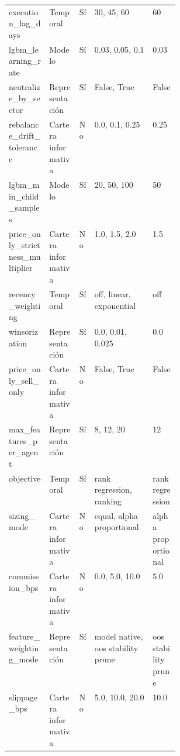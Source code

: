 \begin{longtable}{lllp{0.34\linewidth}l}
execution\_lag\_days & Temporal & Sí & 30, 45, 60 & 60 \\
lgbm\_learning\_rate & Modelo & Sí & 0.03, 0.05, 0.1 & 0.03 \\
neutralize\_by\_sector & Representación & Sí & False, True & False \\
rebalance\_drift\_tolerance & Cartera informativa & No & 0.0, 0.1, 0.25 & 0.25 \\
lgbm\_min\_child\_samples & Modelo & Sí & 20, 50, 100 & 50 \\
price\_only\_strictness\_multiplier & Cartera informativa & No & 1.0, 1.5, 2.0 & 1.5 \\
recency\_weighting & Temporal & Sí & off, linear, exponential & off \\
winsorization & Representación & Sí & 0.0, 0.01, 0.025 & 0.0 \\
price\_only\_sell\_only & Cartera informativa & No & False, True & False \\
max\_features\_per\_agent & Representación & Sí & 8, 12, 20 & 12 \\
objective & Temporal & Sí & rank regression, ranking & rank regression \\
sizing\_mode & Cartera informativa & No & equal, alpha proportional & alpha proportional \\
commission\_bps & Cartera informativa & No & 0.0, 5.0, 10.0 & 5.0 \\
feature\_weighting\_mode & Representación & Sí & model native, oos stability prune & oos stability prune \\
slippage\_bps & Cartera informativa & No & 5.0, 10.0, 20.0 & 10.0 \\
\end{longtable}
